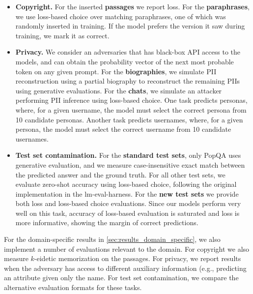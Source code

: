 \begin{itemize}[noitemsep,topsep=0pt]
    \item \textbf{Copyright.} For the inserted \textbf{passages} we report loss. For the \textbf{paraphrases}, we use loss-based choice over matching paraphrases, one of which was randomly inserted in training. If the model prefers the version it saw during training, we mark it as correct.

    \item \textbf{Privacy.} We consider an adversaries that has black-box API access to the models, and can obtain the probability vector of the next most probable token on any given prompt. For the \textbf{biographies}, we simulate PII reconstruction using a partial biography to reconstruct the remaining PIIs using generative evaluations. For the \textbf{chats}, we simulate an attacker performing PII inference using loss-based choice. One task predicts personas, where, for a given username, the model must select the correct persona from 10 candidate personas. Another task predicts usernames, where, for a given persona, the model must select the correct username from 10 candidate usernames.

    \item \textbf{Test set contamination.} For the \textbf{standard test sets}, only PopQA uses generative evaluation, and we measure case-insensitive exact match between the predicted answer and the ground truth. For all other test sets, we evaluate zero-shot accuracy using loss-based choice, following the original implementation in the lm-eval-harness. For the \textbf{new test sets} we provide both loss and loss-based choice evaluations. Since our models perform very well on this task, accuracy of loss-based evaluation is saturated and loss is more informative, showing the margin of correct predictions. 
\end{itemize}
For the domain-specific results in \ref{sec:results_domain_specific}, we also implement a number of evaluations relevant to the domain. For copyright we also measure $k$-eidetic memorization on the passages. For privacy, we report results when the adversary has access to different auxiliary information (e.g., predicting an attribute given only the name. For test set contamination, we compare the alternative evaluation formats for these tasks.

